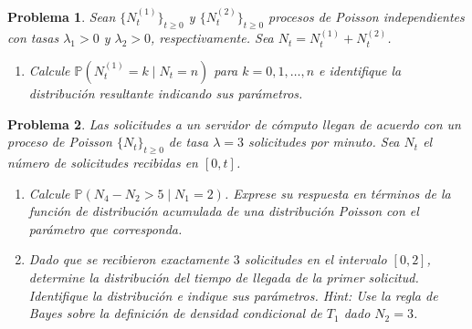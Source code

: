 \documentclass[12pt]{article}
\newtheorem{problem}{Problema}
\begin{document}
\begin{problem}
Sean $\{N_t^{(1)}\}_{t \geq 0}$ y $\{N_t^{(2)}\}_{t \geq 0}$ procesos de Poisson independientes con tasas $\lambda_1 > 0$ y
$\lambda_2 > 0$, respectivamente. Sea $N_t = N_t^{(1)} + N_t^{(2)}$.
\begin{enumerate}
    \item[(a)] Calcule $\mathbb{P}(N_t^{(1)} = k \mid N_t = n)$ para $k = 0, 1, \ldots, n$ e
        identifique la distribución resultante indicando sus parámetros.
\end{enumerate}
\end{problem}

\begin{problem}
Las solicitudes a un servidor de cómputo llegan de acuerdo con un proceso de Poisson $\{N_t\}_{t \geq 0}$ de tasa
$\lambda = 3$ solicitudes por minuto. Sea $N_t$ el número de solicitudes recibidas en $[0,t]$.
\begin{enumerate}
    \item[(a)] Calcule $\mathbb{P}\!\left(N_4-N_2>5 \;\Big|\; N_1=2\right)$. Exprese su
        respuesta en términos de la función de distribución acumulada de una distribución Poisson
        con el parámetro que corresponda.
    \item[(b)] Dado que se recibieron exactamente $3$ solicitudes en el intervalo $[0,2]$,
        determine la distribución del tiempo de llegada de la primer solicitud. Identifique la
        distribución e indique sus parámetros. Hint: Use la regla de Bayes sobre la definición de densidad condicional de $T_1$ dado $N_2=3$.
\end{enumerate}
\end{problem}

\end{document}
